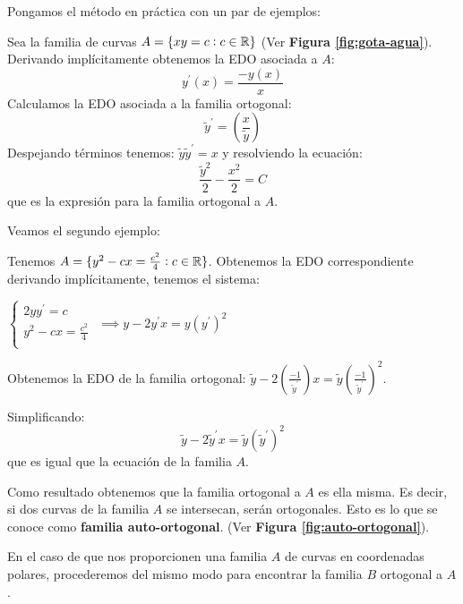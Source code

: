 Pongamos el método en práctica con un par de ejemplos:


\begin{example}
Sea la familia de curvas $A = \{ xy = c : c\in \mathbb{R} \}$ (Ver \textbf{Figura \ref{fig:gota-agua}}).
Derivando implícitamente obtenemos la EDO asociada a $A$:
$$y^\prime(x) = \frac{-y(x)}{x}$$
Calculamos la EDO asociada a la familia ortogonal:
$$\tilde{y}^\prime=(\frac{x}{\tilde{y}})$$
Despejando términos tenemos: $\tilde{y}\tilde{y}^\prime = x$ y resolviendo la ecuación:
$$\frac{\tilde{y}^2}{2}-\frac{x^2}{2} = C$$
que es la expresión para la familia ortogonal a $A$.
\end{example}

Veamos el segundo ejemplo:


\begin{example}
Tenemos $A=\{ y^2-cx=\frac{c^2}{4} : c\in \mathbb{R} \}$.
Obtenemos la EDO correspondiente derivando implícitamente, tenemos el sistema:

\begin{center}
$
  \left\lbrace
  \begin{array}{l}
     2yy^\prime = c \\
     y^2-cx = \frac{c^2}{4} \\
  \end{array}
  \right.
$
$\implies y-2y^\prime x = y(y^\prime)^2$
\end{center}
Obtenemos la EDO de la familia ortogonal: $\tilde{y}-2(\frac{-1}{\tilde{y}^\prime})x=\tilde{y}(\frac{-1}{\tilde{y}^\prime})^2$. 

Simplificando: $$\tilde{y}-2\tilde{y}^\prime x = \tilde{y}(\tilde{y}^\prime)^2$$ que es igual que la ecuación de la familia $A$.

Como resultado obtenemos que la familia ortogonal a $A$ es ella misma. Es decir, si dos curvas de la familia $A$ se intersecan, serán ortogonales. Esto es lo que se conoce como \textbf{familia auto-ortogonal}. (Ver \textbf{Figura \ref{fig:auto-ortogonal}}).
\end{example}

En el caso de que nos proporcionen una familia $A$ de curvas en coordenadas polares, procederemos del mismo modo para encontrar la familia  $B$ ortogonal a $A$. 

